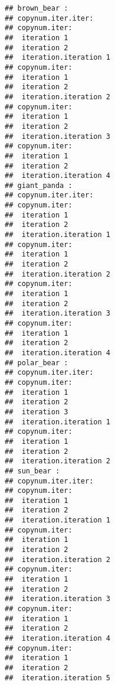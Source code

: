 \documentclass[]{article}
\newenvironment{Shaded}{\begin{snugshade}}{\end{snugshade}}
\newcommand{\KeywordTok}[1]{\textcolor[rgb]{0.13,0.29,0.53}{\textbf{#1}}}
\newcommand{\DataTypeTok}[1]{\textcolor[rgb]{0.13,0.29,0.53}{#1}}
\newcommand{\DecValTok}[1]{\textcolor[rgb]{0.00,0.00,0.81}{#1}}
\newcommand{\CharTok}[1]{\textcolor[rgb]{0.31,0.60,0.02}{#1}}
\newcommand{\StringTok}[1]{\textcolor[rgb]{0.31,0.60,0.02}{#1}}
\newcommand{\OtherTok}[1]{\textcolor[rgb]{0.56,0.35,0.01}{#1}}
\newcommand{\ControlFlowTok}[1]{\textcolor[rgb]{0.13,0.29,0.53}{\textbf{#1}}}
\newcommand{\OperatorTok}[1]{\textcolor[rgb]{0.81,0.36,0.00}{\textbf{#1}}}
\newcommand{\NormalTok}[1]{#1}
\begin{document}
\begin{Shaded}
\end{Shaded}

\begin{verbatim}
## brown_bear :
## copynum.iter.iter:
## copynum.iter:
##  iteration 1 
##  iteration 2 
##  iteration.iteration 1 
## copynum.iter:
##  iteration 1 
##  iteration 2 
##  iteration.iteration 2 
## copynum.iter:
##  iteration 1 
##  iteration 2 
##  iteration.iteration 3 
## copynum.iter:
##  iteration 1 
##  iteration 2 
##  iteration.iteration 4 
## giant_panda :
## copynum.iter.iter:
## copynum.iter:
##  iteration 1 
##  iteration 2 
##  iteration.iteration 1 
## copynum.iter:
##  iteration 1 
##  iteration 2 
##  iteration.iteration 2 
## copynum.iter:
##  iteration 1 
##  iteration 2 
##  iteration.iteration 3 
## copynum.iter:
##  iteration 1 
##  iteration 2 
##  iteration.iteration 4 
## polar_bear :
## copynum.iter.iter:
## copynum.iter:
##  iteration 1 
##  iteration 2 
##  iteration 3 
##  iteration.iteration 1 
## copynum.iter:
##  iteration 1 
##  iteration 2 
##  iteration.iteration 2 
## sun_bear :
## copynum.iter.iter:
## copynum.iter:
##  iteration 1 
##  iteration 2 
##  iteration.iteration 1 
## copynum.iter:
##  iteration 1 
##  iteration 2 
##  iteration.iteration 2 
## copynum.iter:
##  iteration 1 
##  iteration 2 
##  iteration.iteration 3 
## copynum.iter:
##  iteration 1 
##  iteration 2 
##  iteration.iteration 4 
## copynum.iter:
##  iteration 1 
##  iteration 2 
##  iteration.iteration 5
\end{verbatim}
\end{document}
